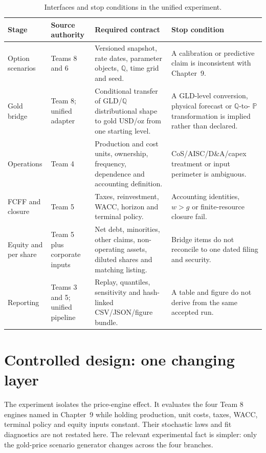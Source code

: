 \begin{table}[H]
\centering
\caption{Interfaces and stop conditions in the unified experiment.}
\label{tab:unified-interface-contract}
\scriptsize
\setlength{\tabcolsep}{3pt}
\renewcommand{\arraystretch}{1.10}
\begin{tabularx}{\textwidth}{@{}p{2.15cm}p{2.15cm}X X@{}}
\toprule
Stage & Source authority & Required contract & Stop condition \\
\midrule
Option scenarios & Teams 8 and 6 & Versioned snapshot, rate dates, parameter
objects, \(\mathbb Q\), time grid and seed. & A calibration or predictive
claim is inconsistent with Chapter~9. \\
Gold bridge & Team 8; unified adapter & Conditional transfer of
GLD/\(\mathbb Q\) distributional shape to gold USD/oz from one starting
level. & A GLD-level conversion, physical forecast or \(\mathbb Q\)-to-
\(\mathbb P\) transformation is implied rather than declared. \\
Operations & Team 4 & Production and cost units, ownership, frequency,
dependence and accounting definition. & CoS/AISC/D\&A/capex treatment or input
perimeter is ambiguous. \\
FCFF and closure & Team 5 & Taxes, reinvestment, WACC, horizon and terminal
policy. & Accounting identities, \(w>g\) or finite-resource closure fail. \\
Equity and per share & Team 5 plus corporate inputs & Net debt, minorities,
other claims, non-operating assets, diluted shares and matching listing. &
Bridge items do not reconcile to one dated filing and security. \\
Reporting & Teams 3 and 5; unified pipeline & Replay, quantiles, sensitivity
and hash-linked CSV/JSON/figure bundle. & A table and figure do not derive from
the same accepted run. \\
\bottomrule
\end{tabularx}
\end{table}

\section{Controlled design: one changing layer}

The experiment isolates the price-engine effect. It evaluates the four Team 8
engines named in Chapter~9 while holding production, unit costs, taxes, WACC,
terminal policy and equity inputs constant. Their stochastic laws and fit
diagnostics are not restated here. The relevant experimental fact is simpler:
only the gold-price scenario generator changes across the four branches.

